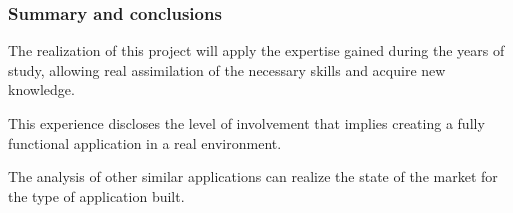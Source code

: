 \begin{frame} [fragile]
	\frametitle{Summary and conclusions}
		The realization of this project will apply the expertise gained during the years of study, allowing real assimilation of the necessary skills and acquire new knowledge.
		
		\bigskip
		This experience discloses the level of involvement that implies creating a fully functional application in a real environment.
		
		\bigskip
		The analysis of other similar applications can realize the state of the market for the type of application built.
	\endblock{}
\end{frame}